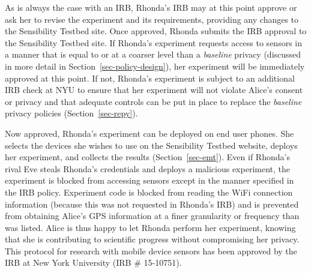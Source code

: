 As is always the case with an IRB, Rhonda's IRB may at this point approve 
or ask her to revise the experiment and its requirements, providing any
changes to the Sensibility Testbed site.  Once approved, Rhonda submits 
the IRB approval to the Sensibility Testbed site.  If 
Rhonda's experiment requests access to sensors in a manner that is 
equal to or at a coarser level than a \emph{baseline} privacy (discussed in more detail
in Section~\ref{sec-policy-design}), her experiment will be immediately approved at this point.
If not, Rhonda's experiment is subject to an additional IRB check at NYU 
to ensure that her experiment will not violate Alice's consent or privacy and
that adequate controls can be put in place to replace the \emph{baseline}
privacy policies (Section~\ref{sec-repy}).

Now approved, Rhonda's experiment can be deployed on end user phones.  She
selects the devices she wishes to use on the Sensibility Testbed 
website, deploys her experiment, and collects the results (Section~\ref{sec-emt}).  
Even if Rhonda's rival Eve steals Rhonda's credentials and deploys a
malicious experiment, the experiment is blocked from accessing sensors except 
in the manner specified in the IRB policy.  Experiment code is blocked from 
reading the WiFi connection information (because this was not requested in
Rhonda's IRB) and is prevented from obtaining Alice's GPS information at a 
finer granularity or frequency than was listed. 
Alice is thus happy to let Rhonda perform her experiment, 
knowing that she is contributing to scientific progress without compromising 
her privacy. 
%
%
This protocol for research with mobile device sensors has been approved by
the IRB at New York University (IRB \# 15-10751).  

